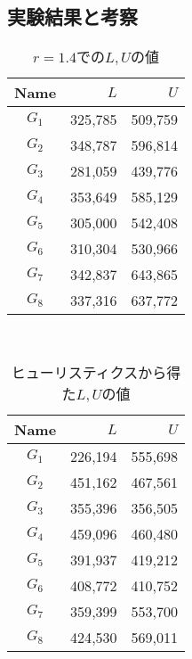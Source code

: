 \documentclass[10pt,a4paper,notitlepage,oneside,twocolumn]{abst_jsarticle}
\begin{document}
\subsection{実験結果と考察}

\begin{table}[htbp]
  \small
  \caption{$r=1.4$での$L, U$の値}
  \label{table:r}
  \centering
  \begin{tabular}{c|rr}
    \hline
    Name & $L$ & $U$ \\
    \hline\hline
    $G_1$ & 325{,}785 & 509{,}759 \\
    $G_2$ & 348{,}787 & 596{,}814 \\
    $G_3$ & 281{,}059 & 439{,}776 \\
    $G_4$ & 353{,}649 & 585{,}129 \\
    $G_5$ & 305{,}000 & 542{,}408 \\
    $G_6$ & 310{,}304 & 530{,}966 \\
    $G_7$ & 342{,}837 & 643{,}865 \\
    $G_8$ & 337{,}316 & 637{,}772 \\
  \end{tabular}
\end{table}

\begin{table}[htbp]
　\small
  \caption{ヒューリスティクスから得た$L, U$の値}
  \label{table:huristic}
  \centering
  \begin{tabular}{c|rr}
    \hline
    Name & $L$ & $U$ \\
    \hline\hline
    $G_1$ & 226{,}194 & 555{,}698 \\
    $G_2$ & 451{,}162 & 467{,}561 \\
    $G_3$ & 355{,}396 & 356{,}505 \\
    $G_4$ & 459{,}096 & 460{,}480 \\
    $G_5$ & 391{,}937 & 419{,}212 \\
    $G_6$ & 408{,}772 & 410{,}752 \\
    $G_7$ & 359{,}399 & 553{,}700 \\
    $G_8$ & 424{,}530 & 569{,}011 \\
  \end{tabular}
\end{table}
\end{document}
